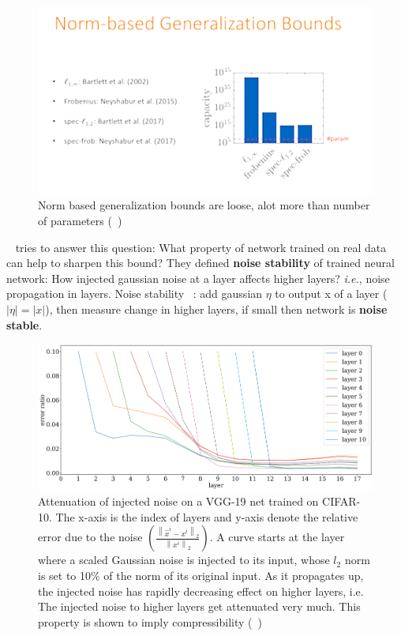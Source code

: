 \documentclass{article} %
\newcommand{\ie}{\emph{i.e.},\xspace}
\begin{document}
\begin{figure}[h]
\begin{center}
\includegraphics[width=0.5\columnwidth]{pix/NormbasedGenBounds.png}
\caption{Norm based generalization bounds are loose, alot more than number of parameters (~\cite{arora2018stronger})}
\end{center}
\label{generalization_mystery}
\end{figure}
~\cite{arora2018stronger} tries to answer this question: What property of network trained on real data can help to sharpen this bound? They defined \textbf{noise stability} of trained neural network: How injected gaussian noise at a layer affects higher layers? \ie noise propagation in layers. Noise stability ~\cite{aroraicml18}: add gaussian $\eta$ to output x of a layer ($|\eta| = |x|$), then measure change in higher layers, if small then network is \textbf{noise stable}.
\begin{figure}[h]
\begin{center}
\includegraphics[width=0.8\columnwidth]{pix/VGGNoiceInjection.png}
\caption{Attenuation of injected noise on a VGG-19 net trained on CIFAR-10. The x-axis is the index of layers and y-axis denote the relative error due to the noise $(\frac{\left \| \hat{x}^i-x^i \right \|_2}{\left \|x^i \right \|_2})$. A curve starts at the layer where a scaled Gaussian noise is injected to its input, whose $l_2$ norm is set to 10\% of the norm of its original input. As it propagates up, the injected noise has rapidly decreasing effect on higher layers, i.e. The injected noise to higher layers get attenuated very much. This property is shown to imply compressibility (~\cite{arora2018stronger})}
\end{center}
\label{VGGnoiseinjection}
\end{figure}
\end{document}
